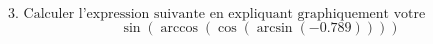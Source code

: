 \documentclass{article}
\begin{document}
\[\text{3. Calculer l'expression suivante en expliquant graphiquement votre raisonnement:}\]
\[\sin(\arccos(\cos(\arcsin(-0.789))))\]
\end{document}
